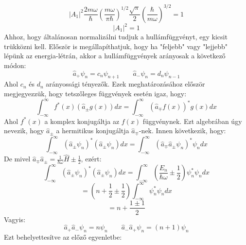 \documentclass[a4paper,12pt]{article}
\begin{document}
\begin{equation}
    |A_1|^2 \frac{2 m \omega}{\hbar} \left( \frac{m \omega}{\pi \hbar} \right)^{1/2} \frac{\sqrt{\pi}}{2} \left( \frac{\hbar}{m \omega} \right)^{3/2} = 1
\end{equation}
\begin{equation}
    |A_1|^2 = 1
\end{equation}
Ahhoz, hogy általánosan normalizálni tudjuk a hullámfüggvényt, egy kicsit trükközni kell. Először is megállapíthatjuk, hogy
ha "feljebb" vagy "lejjebb" lépünk az  energia-létrán, akkor a hullámfüggvények arányosak a következő módon:
\begin{equation}
    \hat{a}_+\psi_{n} = c_n \psi_{n+1} \quad \quad \hat{a}_- \psi_{n} = d_n \psi_{n-1}
\end{equation}
Ahol $c_n$ és $d_n$ arányossági tényezők. Ezek meghatározásához először megjegyezzük, hogy tetszőleges függvények esetén igaz, hogy:
\begin{equation}
    \int_{-\infty}^{\infty} f^*(x) (\hat{a}_\pm g(x)) dx = \int_{-\infty}^{\infty} (\hat{a}_\mp f(x))^* g(x) dx
\end{equation}
Ahol $f^*(x)$ a komplex konjugáltja az $f(x)$ függvénynek. Ezt algebrában úgy nevezik, hogy $\hat{a}_\pm$ a hermitikus konjugáltja $\hat{a}_\mp$-nek.
Innen következik, hogy:
\begin{equation}
    \int_{-\infty}^{\infty} (\hat{a}_\pm \psi_n)^* (\hat{a}_\pm \psi_n) dx = \int_{-\infty}^{\infty} (\hat{a}_\mp \hat{a}_\pm \psi_n)^* \psi_n dx
\end{equation}
De mivel $\hat{a}_\mp \hat{a}_\pm = \frac{1}{\hbar \omega} \hat{H} \pm \frac{1}{2}$, ezért:
\begin{equation}
    \int_{-\infty}^{\infty} (\hat{a}_\pm \psi_n)^* (\hat{a}_\pm \psi_n) dx = \int_{-\infty}^{\infty} \left( \frac{E_n}{\hbar \omega} \pm \frac{1}{2} \right) \psi_n^* \psi_n dx
\end{equation}
\begin{equation}
    = \left( n + \frac{1}{2} \pm \frac{1}{2} \right) \int_{-\infty}^{\infty} \psi_n^* \psi_n dx
\end{equation}
\begin{equation}
    = n + \frac{1 \pm 1}{2}
\end{equation}
Vagyis:
\begin{equation}
    \hat{a}_+ \hat{a}_- \psi_n = n \psi_n \quad \quad \hat{a}_- \hat{a}_+ \psi_n = (n + 1) \psi_n
\end{equation}
Ezt behelyettesítve az előző egyenletbe:
\end{document}

